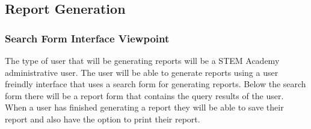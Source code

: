 \documentclass[letterpaper,10pt,serif, draftclsnofoot,onecolumn, compsoc, titlepage]{IEEEtran}
\begin{document}
\subsection{Report Generation}

\subsubsection{Search Form Interface Viewpoint}
The type of user that will be generating reports will be a STEM Academy administrative user. The user will be able to generate reports using a user freindly interface that uses a search form for generating reports. Below the search form there will be a report form that contains the query results of the user. When a user has finished generating a report they will be able to save their report and also have the option to print their report. 
\end{document}
